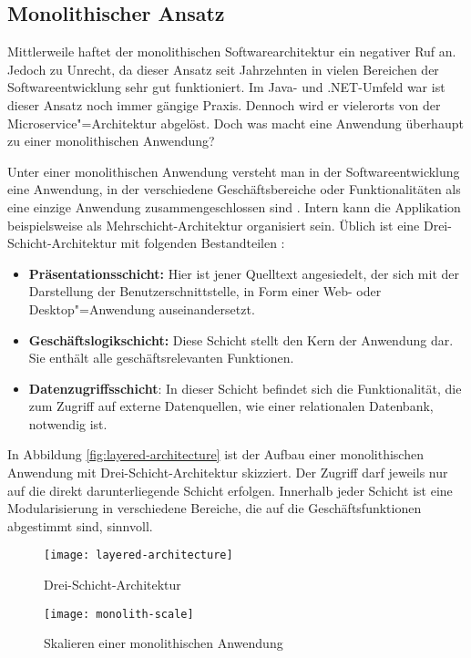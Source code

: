 \subsection{Monolithischer Ansatz}

Mittlerweile haftet der monolithischen Softwarearchitektur ein negativer Ruf an. Jedoch zu Unrecht, da dieser Ansatz seit Jahrzehnten  in vielen Bereichen der Softwareentwicklung sehr gut funktioniert. Im Java- und .NET-Umfeld war \bzw ist dieser Ansatz noch immer gängige Praxis. Dennoch wird er vielerorts von der Microservice"=Architektur abgelöst. Doch was macht eine Anwendung überhaupt zu einer monolithischen Anwendung?

Unter einer monolithischen Anwendung versteht man in der Softwareentwicklung eine Anwendung, in der verschiedene Geschäftsbereiche oder Funktionalitäten als eine einzige Anwendung zusammengeschlossen sind \cite{FowlerMS}. Intern kann die Applikation beispielsweise als Mehrschicht-Architektur organisiert sein. Üblich ist eine Drei-Schicht-Architektur mit folgenden Bestandteilen \cite[19]{FowlerPEA}:

\begin{itemize}
	\item \textbf{Präsentationsschicht:} Hier ist jener Quelltext angesiedelt, der sich mit der Darstellung der Benutzerschnittstelle, \zB in Form einer Web- oder Desktop"=Anwendung auseinandersetzt.
	\item \textbf{Geschäftslogikschicht:} Diese Schicht stellt den Kern der Anwendung dar. Sie enthält alle geschäftsrelevanten Funktionen.
	\item \textbf{Datenzugriffsschicht}: In dieser Schicht befindet sich die Funktionalität, die zum Zugriff auf externe Datenquellen, wie \zB einer relationalen Datenbank, notwendig ist.
\end{itemize}

In Abbildung \ref{fig:layered-architecture} ist der Aufbau einer monolithischen Anwendung mit Drei-Schicht-Architektur skizziert. Der Zugriff darf jeweils nur auf die direkt darunterliegende Schicht erfolgen. Innerhalb jeder Schicht ist eine Modularisierung in verschiedene Bereiche, die auf die Geschäftsfunktionen abgestimmt sind, sinnvoll.

\begin{figure}[!htb]
\centering
{}
  \centering
	\texttt{[image: layered-architecture]}
	\caption{Drei-Schicht-Architektur}
	\label{fig:layered-architecture}
\endminipage
{}
  \centering
	\texttt{[image: monolith-scale]}
	\caption{Skalieren einer monolithischen Anwendung}
	\label{fig:monolith-scale}
\endminipage
\end{figure}

